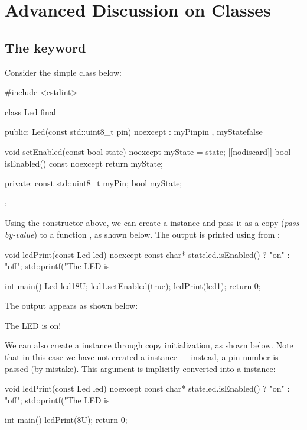 
\section{Advanced Discussion on Classes}
\label{c2:sec:classes2}\label{c2:app:b}

\subsection{The keyword }
\label{c2:sec:explicit}
Consider the simple class  below:

\begin{cppcode}
#include <cstdint>

class Led final
{
public:
    Led(const std::uint8_t pin) noexcept
        : myPin{pin}
        , myState{false}
    {}

    void setEnabled(const bool state) noexcept { myState = state; }
    [[nodiscard]] bool isEnabled() const noexcept { return myState; }

private:
    const std::uint8_t myPin;
    bool myState;
};
\end{cppcode}

\noindent Using the constructor above, we can create a  instance and pass it as a copy
(\emph{pass-by-value}) to a function , as shown below. The output is printed using
 from :

\begin{cppcode}
void ledPrint(const Led led) noexcept
{
    const char* state{led.isEnabled() ? "on" : "off"};
    std::printf("The LED is %
}

int main()
{
    Led led1{8U};
    led1.setEnabled(true);
    ledPrint(led1);
    return 0;
}
\end{cppcode}

\noindent The output appears as shown below:

\begin{console}
The LED is on!
\end{console}

\noindent We can also create a  instance through copy initialization, as shown below. Note
that in this case we have not created a  instance --- instead, a pin number is passed (by
mistake). This argument is implicitly converted into a  instance:

\begin{cppcode}
void ledPrint(const Led led) noexcept
{
    const char* state{led.isEnabled() ? "on" : "off"};
    std::printf("The LED is %
}

int main()
{
    ledPrint(8U);
    return 0;
}
\end{cppcode}


